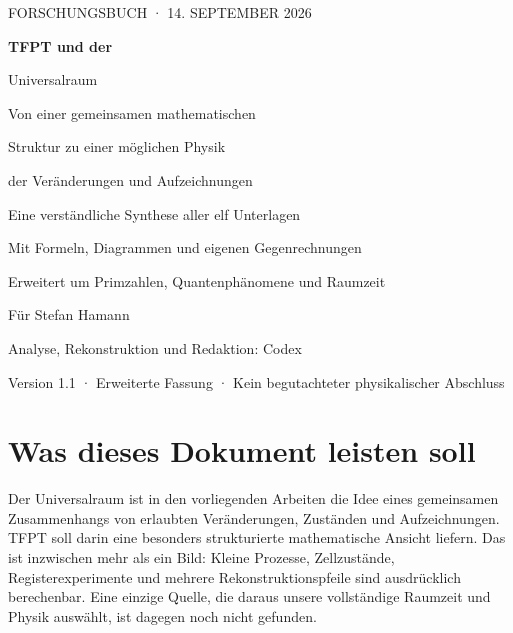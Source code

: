 \documentclass[11pt,a4paper,oneside,parskip=half,headings=normal]{scrreprt}
\begin{document}
\hypersetup{pageanchor=false}
\begin{titlepage}
\pagecolor{navy}\color{white}
\vspace*{5mm}
{\sffamily\large FORSCHUNGSBUCH · 14. SEPTEMBER 2026\par}
\vspace{22mm}
{\sffamily\bfseries\fontsize{36}{42}\selectfont TFPT und der\par Universalraum\par}
\vspace{12mm}
{\sffamily\fontsize{17}{23}\selectfont Von einer gemeinsamen mathematischen\par Struktur zu einer möglichen Physik\par der Veränderungen und Aufzeichnungen\par}
\vspace{15mm}
\vfill
{\sffamily\large Eine verständliche Synthese aller elf Unterlagen\par}
\vspace{4mm}
{\sffamily\normalsize Mit Formeln, Diagrammen und eigenen Gegenrechnungen\par Erweitert um Primzahlen, Quantenphänomene und Raumzeit\par}
\vspace{12mm}
{\sffamily\small Für Stefan Hamann\par Analyse, Rekonstruktion und Redaktion: Codex\par}
\vspace{6mm}
{\sffamily\small\color{white!75}Version 1.1 · Erweiterte Fassung · Kein begutachteter physikalischer Abschluss\par}
\end{titlepage}
\nopagecolor\color{black}
\hypersetup{pageanchor=true}
\chapter*{Was dieses Dokument leisten soll}
Der Universalraum ist in den vorliegenden Arbeiten die Idee eines gemeinsamen Zusammenhangs von erlaubten Veränderungen, Zuständen und Aufzeichnungen. TFPT soll darin eine besonders strukturierte mathematische Ansicht liefern. Das ist inzwischen mehr als ein Bild: Kleine Prozesse, Zellzustände, Registerexperimente und mehrere Rekonstruktionspfeile sind ausdrücklich berechenbar. Eine einzige Quelle, die daraus unsere vollständige Raumzeit und Physik auswählt, ist dagegen noch nicht gefunden.
\end{document}
